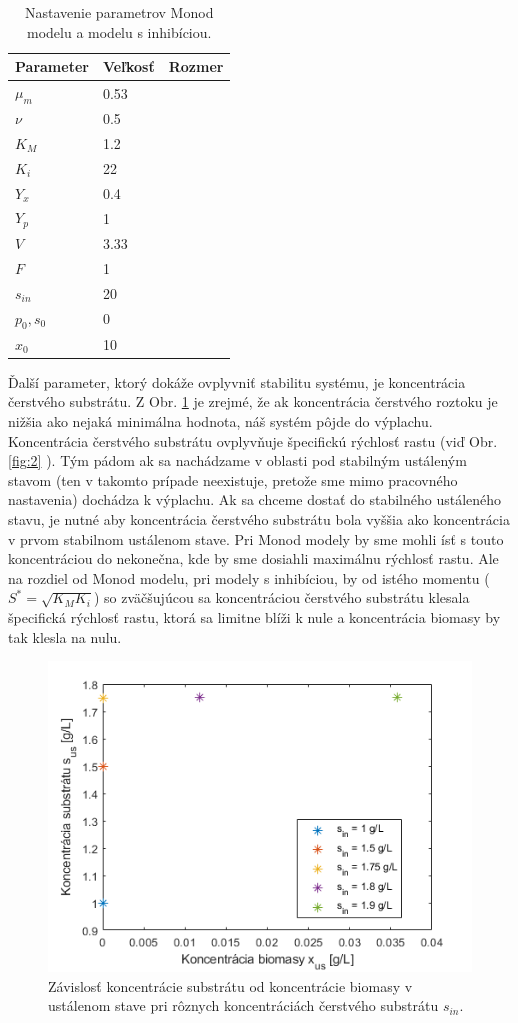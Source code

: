 \begin{table}
	\centering
	\caption{Nastavenie parametrov Monod modelu a modelu s inhibíciou.}
	\label{tab: 3}
	\begin{tabular}{lll}
		\hline
		\textbf{Parameter} & \textbf{Veľkosť} & \textbf{Rozmer} \\
		\hline
	 	$\mu_{m}$ & 0.53 & \unitfrac{1}{\hour} \\
	 	$\nu$ & 0.5 & \unitfrac{1}{\hour} \\
		$K_{M}$ & 1.2 & \unitfrac{\gram}{\liter} \\
		$K_{i}$ & 22 & \unitfrac{\gram}{\liter} \\
		$Y_{x}$ & 0.4 & \\
		$Y_{p}$ & 1 & \\
		$V$ & 3.33 & \liter \\
		$F$ & 1 & \unitfrac{\liter}{\hour} \\
		$s_{in}$ & 20 & \unitfrac{\gram}{\liter} \\
		$p_0, s_0$ & 0 & \unitfrac{\gram}{\liter} \\
		$x_0$ & 10 & \unitfrac{\gram}{\liter} \\
		\hline
	\end{tabular}
\end{table}

Ďalší parameter, ktorý dokáže ovplyvniť stabilitu systému, je koncentrácia čerstvého substrátu. Z Obr. \ref{fig:7} je zrejmé, že ak koncentrácia čerstvého roztoku je nižšia ako nejaká minimálna hodnota, náš systém pôjde do výplachu. Koncentrácia čerstvého substrátu ovplyvňuje špecifickú rýchlosť rastu (viď Obr. \ref{fig:2} ). Tým pádom ak sa nachádzame v oblasti pod stabilným ustáleným stavom (ten v takomto prípade neexistuje, pretože sme mimo pracovného nastavenia) dochádza k výplachu. Ak sa chceme dostať do stabilného ustáleného stavu, je nutné aby koncentrácia čerstvého substrátu bola vyššia ako koncentrácia v prvom stabilnom ustálenom stave. Pri Monod modely by sme mohli ísť s touto koncentráciou do nekonečna, kde by sme dosiahli maximálnu rýchlosť rastu. Ale na rozdiel od Monod modelu, pri modely s inhibíciou, by od istého momentu ($S^{*} = \sqrt{K_M K_i}$) so zväčšujúcou sa koncentráciou čerstvého substrátu klesala špecifická rýchlosť rastu, ktorá sa limitne blíži k nule a koncentrácia biomasy by tak klesla na nulu.

\begin{figure}
	\centering
	\includegraphics[width=.7\linewidth]{images/s_in_inhb}
	\caption[]{Závislosť koncentrácie substrátu od koncentrácie biomasy v ustálenom stave pri rôznych koncentráciách čerstvého substrátu $s_{in}$.}
	\label{fig:7}
\end{figure}
